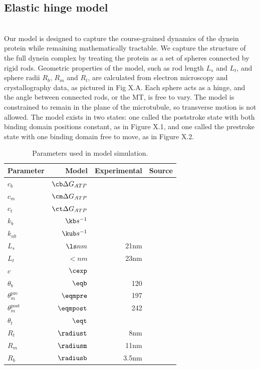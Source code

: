 \documentclass[9pt,twocolumn,twoside]{pnas-new}
\begin{document}
\subsection*{Elastic hinge model}~\\
Our model is designed to capture the course-grained dynamics of the dynein protein while remaining mathematically tractable. We capture the structure of the full dynein complex by treating the protein as a set of spheres connected by rigid rods. Geometric properties of the model, such as rod length $L_s$ and $L_t$, and sphere radii $R_b$, $R_m$ and $R_t$, are calculated from electron microscopy and crystallography data, as pictured in Fig X.A. Each sphere acts as a hinge, and the angle between connected rods, or the MT, is free to vary. The model is constrained to remain in the plane of the microtubule, so transverse motion is not allowed. The model exists in two states: one called the poststroke state with both binding domain positions constant, as in Figure X.1, and one called the prestroke state with one binding domain free to move, as in Figure X.2.

\begin{table}[tbhp]
\centering
\caption{Parameters used in model simulation.}
\label{tab:staticparams}
\begin{tabular}{lrrr}
Parameter & Model & Experimental & Source \\
\midrule
$c_b$ & $\cb \Delta G_{ATP}$ &  & \\
$c_m$ & $\cm \Delta G_{ATP}$ &  & \\
$c_t$ & $\ct \Delta G_{ATP}$ &  & \\
$k_b$ & $\kb s^{-1}$&  & \\
$k_{ub}$ & $\kub s^{-1}$ & & \\
$L_s$ & $\ls nm$ & 21nm & \cite{burgess-paper, 3vkh-cite, carter-paper}\\
$L_t$ & $\lt nm$ & 23nm & \cite{burgess-paper, 3vkh-cite, carter-paper}\\
$c$ & $\cexp$ & & \\
$\theta_b$ & $\eqb$ &  120 & \cite{leschziner} \\
$\theta_m^{\mbox{pre}}$ & $\eqmpre$ &  197 & \cite{burgess-paper}\\
$\theta_m^{\mbox{post}}$ & $\eqmpost$ & 242 & \cite{burgess-paper}\\
$\theta_t$ & $\eqt$ &  & \\
$R_t$ & $\radiust$ & 8nm & \cite{burgess-paper}\\
$R_m$ & $\radiusm$ & 11nm & \cite{burgess-paper}\\
$R_b$ & $\radiusb$ & 3.5nm & \cite{burgess-paper}\\

\bottomrule
\end{tabular}

\end{table}
\end{document}
